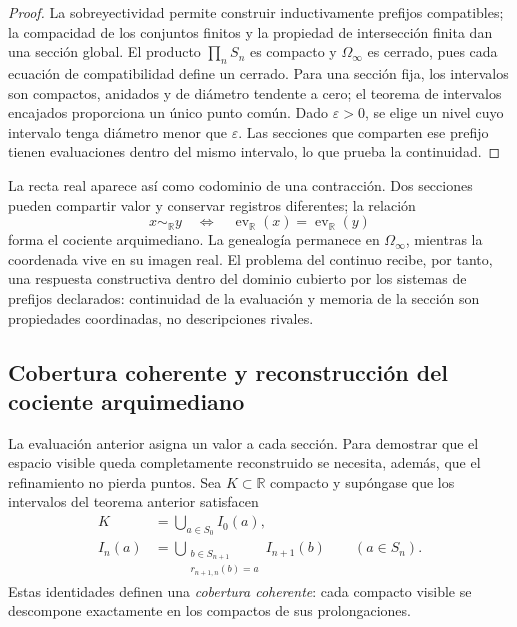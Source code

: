 \begin{proof}
La sobreyectividad permite construir inductivamente prefijos compatibles; la
compacidad de los conjuntos finitos y la propiedad de intersección finita dan
una sección global. El producto \(\prod_nS_n\) es compacto y
\(\Omega_\infty\) es cerrado, pues cada ecuación de compatibilidad define un
cerrado. Para una sección fija, los intervalos son compactos, anidados y de
diámetro tendente a cero; el teorema de intervalos encajados proporciona un
único punto común. Dado \(\varepsilon>0\), se elige un nivel cuyo intervalo
tenga diámetro menor que \(\varepsilon\). Las secciones que comparten ese
prefijo tienen evaluaciones dentro del mismo intervalo, lo que prueba la
continuidad.
\end{proof}

La recta real aparece así como codominio de una contracción. Dos secciones
pueden compartir valor y conservar registros diferentes; la relación
\[
 x\sim_{\mathbb R}y
 \quad\Longleftrightarrow\quad
 \operatorname{ev}_{\mathbb R}(x)=\operatorname{ev}_{\mathbb R}(y)
\]
forma el cociente arquimediano. La genealogía permanece en
\(\Omega_\infty\), mientras la coordenada vive en su imagen real. El problema
del continuo recibe, por tanto, una respuesta constructiva dentro del dominio
cubierto por los sistemas de prefijos declarados: continuidad de la
evaluación y memoria de la sección son propiedades coordinadas, no
descripciones rivales.

\subsection{Cobertura coherente y reconstrucción del cociente arquimediano}

La evaluación anterior asigna un valor a cada sección. Para demostrar que el
espacio visible queda completamente reconstruido se necesita, además, que el
refinamiento no pierda puntos. Sea \(K\subset\mathbb R\) compacto y supóngase
que los intervalos del teorema anterior satisfacen
\begin{align}
 K&=\bigcup_{a\in S_0} I_0(a),
 \label{eq:cobertura-inicial-continuo-rev3}\\
 I_n(a)&=\bigcup_{\substack{b\in S_{n+1}\\r_{n+1,n}(b)=a}}I_{n+1}(b)
 \qquad(a\in S_n).
 \label{eq:cobertura-hijos-continuo-rev3}
\end{align}
Estas identidades definen una \emph{cobertura coherente}: cada compacto
visible se descompone exactamente en los compactos de sus prolongaciones.

